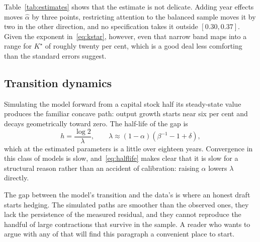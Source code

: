 Table~\ref{tab:estimates} shows that the estimate is not delicate. Adding year
effects moves $\hat{\alpha}$ by three points, restricting attention to the
balanced sample moves it by two in the other direction, and no specification
takes it outside $[0.30, 0.37]$. Given the exponent in~\eqref{eq:kstar}, however,
even that narrow band maps into a range for $K^{\star}$ of roughly twenty per
cent, which is a good deal less comforting than the standard errors suggest.

\subsection{Transition dynamics}

Simulating the model forward from a capital stock half its steady-state value
produces the familiar concave path: output growth starts near six per cent and
decays geometrically toward zero. The half-life of the gap is
\begin{equation}
  h = \frac{\log 2}{\lambda},
  \qquad
  \lambda \approx (1 - \alpha)\left( \beta^{-1} - 1 + \delta \right),
  \label{eq:halflife}
\end{equation}
which at the estimated parameters is a little over eighteen years. Convergence
in this class of models is slow, and~\eqref{eq:halflife} makes clear that it is
slow for a structural reason rather than an accident of calibration: raising
$\alpha$ lowers $\lambda$ directly.

The gap between the model's transition and the data's is where an honest draft
starts hedging. The simulated paths are smoother than the observed ones, they
lack the persistence of the measured residual, and they cannot reproduce the
handful of large contractions that survive in the sample. A reader who wants to
argue with any of that will find this paragraph a convenient place to start.
